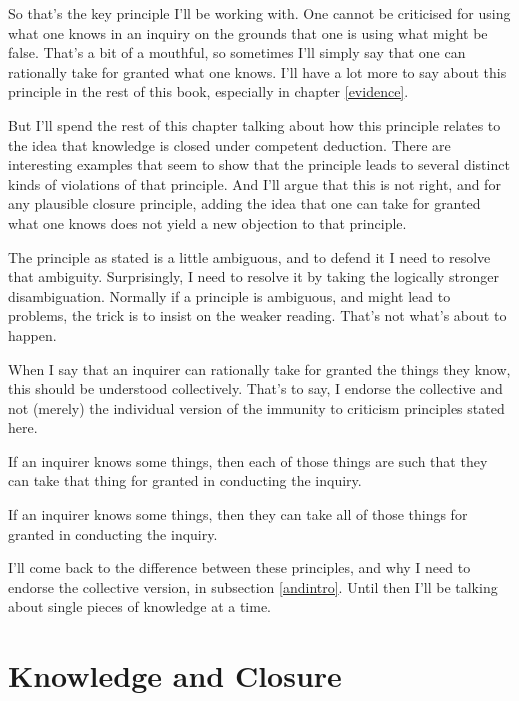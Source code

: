 \documentclass[
  11pt,
]{book}
\providecommand{\tightlist}{%
  \setlength{\itemsep}{0pt}\setlength{\parskip}{0pt}}
\begin{document}
So that's the key principle I'll be working with. One cannot be criticised for using what one knows in an inquiry on the grounds that one is using what might be false. That's a bit of a mouthful, so sometimes I'll simply say that one can rationally take for granted what one knows. I'll have a lot more to say about this principle in the rest of this book, especially in chapter \ref{evidence}.

But I'll spend the rest of this chapter talking about how this principle relates to the idea that knowledge is closed under competent deduction. There are interesting examples that seem to show that the principle leads to several distinct kinds of violations of that principle. And I'll argue that this is not right, and for any plausible closure principle, adding the idea that one can take for granted what one knows does not yield a new objection to that principle.

The principle as stated is a little ambiguous, and to defend it I need to resolve that ambiguity. Surprisingly, I need to resolve it by taking the logically stronger disambiguation. Normally if a principle is ambiguous, and might lead to problems, the trick is to insist on the weaker reading. That's not what's about to happen.

When I say that an inquirer can rationally take for granted the things they know, this should be understood collectively. That's to say, I endorse the collective and not (merely) the individual version of the immunity to criticism principles stated here.

\begin{description}
\tightlist
\item[Take for Granted (Individual)]
If an inquirer knows some things, then each of those things are such that they can take that thing for granted in conducting the inquiry.
\item[Take for Granted (Collective)]
If an inquirer knows some things, then they can take all of those things for granted in conducting the inquiry.
\end{description}

I'll come back to the difference between these principles, and why I need to endorse the collective version, in subsection \ref{andintro}. Until then I'll be talking about single pieces of knowledge at a time.

\hypertarget{knowledge-and-closure}{%
\section{Knowledge and Closure}\label{knowledge-and-closure}}
\end{document}
